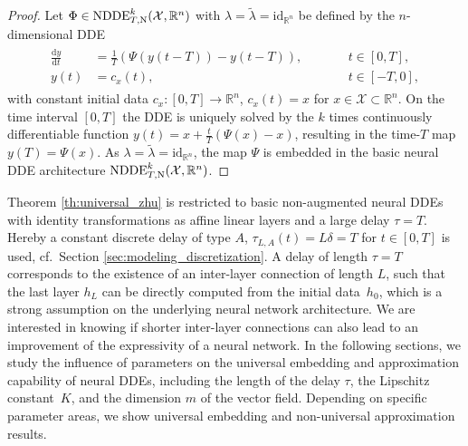 \documentclass[10pt]{article}
\numberwithin{equation}{section}
\newcommand*{\dd}{\mathrm{d}}
\begin{document}
	\begin{proof}
		Let $\Phi \in \textup{NDDE}_{T,\textup{N}}^k(\mathcal{X},\mathbb{R}^n)$ with  $\lambda = \tilde\lambda = \text{id}_{\mathbb{R}^n}$ be defined by the $n$-dimensional DDE
		\begin{align} \label{eq:vectorfield_zhu}
			\begin{aligned}
				\frac{\dd y}{\dd t} &= \frac{1}{T} (\Psi(y(t-T))-y(t-T)), \qquad&& t \in [0,T], \\
				y(t) &= c_x(t), &&t \in [-T,0],
			\end{aligned}
		\end{align}
		with constant initial data $c_x: [0,T] \rightarrow \mathbb{R}^n$, $c_x(t) = x$ for $x \in \mathcal{X} \subset \mathbb{R}^n$. On the time interval $[0,T]$ the DDE is uniquely solved by the $k$ times continuously differentiable function $y(t) = x + \frac{t}{T}(\Psi(x)-x)$, resulting in the time-$T$ map $y(T) = \Psi(x)$. As $\lambda = \tilde\lambda = \text{id}_{\mathbb{R}^n}$, the map $\Psi$ is embedded in the basic neural DDE architecture $\textup{NDDE}_{T,\text{N}}^k(\mathcal{X},\mathbb{R}^n)$.
	\end{proof}
	
	Theorem \ref{th:universal_zhu} is restricted to basic non-augmented neural DDEs with identity transformations as affine linear layers and a large delay $\tau = T$. Hereby a constant discrete delay of type $A$, $\tau_{L,A}(t) = L\delta =T$ for $t\in[0,T]$ is used, cf.\ Section \ref{sec:modeling_discretization}.  A delay of length $\tau = T$ corresponds to the existence of an inter-layer connection of length $L$, such that the last layer $h_L$ can be directly computed from the initial data~$h_0$, which is a strong assumption on the underlying neural network architecture. We are interested in knowing if shorter inter-layer connections can also lead to an improvement of the expressivity of a neural network. In the following sections, we study the influence of parameters on the universal embedding and approximation capability of neural DDEs, including the length of the delay $\tau$, the Lipschitz constant~$K$, and the dimension $m$ of the vector field. Depending on specific parameter areas, we show universal embedding and non-universal approximation results.
	
\end{document}
